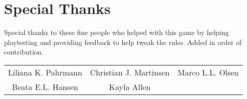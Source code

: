 \section*{Special Thanks}
Special thanks to these fine people who helped with this game by helping playtesting and providing feedback to help tweak the rules.
Added in order of contribution.
\vspace{5mm}

\noindent\begin{tabular}{ccc}
    Liliana K. Pahrmann & Christian J. Martinsen & Marco L.L. Olsen\\ 
    Beata E.L. Hansen & Kayla Allen\\
\end{tabular}